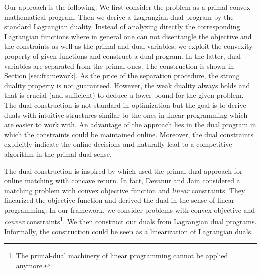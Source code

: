 \documentclass[11pt]{article}
\begin{document}
Our approach is the following. We first consider the problem as a primal convex mathematical program. 
Then we derive a Lagrangian dual program by the standard Lagrangian duality. 
Instead of analyzing directly the corresponding Lagrangian functions
where in general one can not disentangle the objective and the constraints
as well as the primal and dual variables,
we exploit the convexity property of given functions and construct 
a dual program. In the latter, dual variables are separated from the primal ones. 
The construction is shown in Section \ref{sec:framework}.
As the price of the separation procedure, the strong duality 
property is not guaranteed. However, the weak duality always holds and that is 
crucial (and sufficient) to deduce a lower bound for the given problem.
The dual construction is not standard in optimization but the goal is to derive 
duals with intuitive structures similar to the ones in linear programming which 
are easier to work with.
An advantage of the approach lies in the dual program
in which the constraints could be maintained online. Moreover, the dual constraints 
explicitly indicate the online decisions and naturally lead to a competitive algorithm
in the primal-dual sense.   

The dual construction is inspired by \cite{DevanurJain12:Online-matching}
which used the primal-dual approach for online
matching with concave return. In fact, Devanur and Jain \cite{DevanurJain12:Online-matching}
considered a matching problem with convex objective function and \emph{linear} constraints.
They linearized the objective function and derived the dual in the sense of linear programming. 
In our framework, we consider problems with convex objective and 
\emph{convex} constraints\footnote{The primal-dual machinery of linear programming cannot be applied anymore.}. 
We then construct our duals from Lagrangian dual programs. 
Informally, the construction could be seen as a linearization of Lagrangian duals. 
\end{document}
